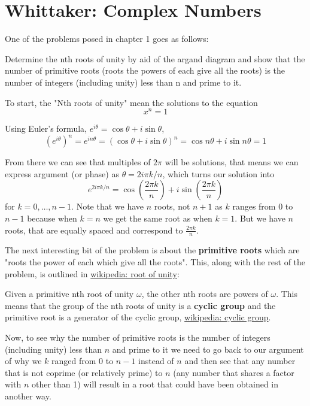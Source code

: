 \section{Whittaker: Complex Numbers}

One of the problems posed in chapter 1 goes as follows:

Determine the nth roots of unity by aid of the argand diagram and show that the number of primitive roots
(roots the powers of each give all the roots) is the number of integers (including unity) less than n and prime to it.

To start, the "Nth roots of unity" mean the solutions to the equation
$$
x^n = 1
$$

Using Euler's formula, $e^{i\theta} = \cos\theta + i\sin\theta$,
$$
\left( e^{i\theta} \right)^n = e^{in\theta} =
\left( \cos\theta + i\sin\theta \right)^n = 
\cos n\theta + i\sin n\theta = 1
$$

From there we can see that multiples of $2\pi$ will be solutions, that means
we can express argument (or phase) as $\theta = 2i\pi k /n$, which turns our solution into
$$
e^{2i\pi k /n} = \cos \left(\frac{2\pi k}{n}\right) + i\sin \left(\frac{2\pi k}{n}\right)
$$
for $k = 0, \dots, n-1$.
Note that we have $n$ roots, not $n+1$ as $k$ ranges from 0 to $n-1$ because when $k=n$ we get the same root as when $k=1$.
But we have $n$ roots, that are equally spaced and correspond to $\frac{2\pi k}{n}$.

The next interesting bit of the problem is about the \textbf{primitive roots} which are
"roots the power of each which give all the roots".
This, along with the rest of the problem, is outlined in
\href{https://en.wikipedia.org/wiki/Root_of_unity}{wikipedia: root of unity}:

Given a primitive nth root of unity $\omega$, the other nth roots are powers of $\omega$.
This means that the group of the nth roots of unity is a \textbf{cyclic group} and the primitive root is a
generator of the cyclic group, \href{https://en.wikipedia.org/wiki/Cyclic_group}{wikipedia: cyclic group}.

Now, to see why the number of primitive roots is the number of integers (including unity) less than $n$ and prime to it
we need to go back to our argument of why we $k$ ranged from 0 to $n-1$ instead of $n$ and then see that any number
that is not coprime (or relatively prime) to $n$ (any number that shares a factor with $n$ other than 1)
will result in a root that could have been obtained in another way.

